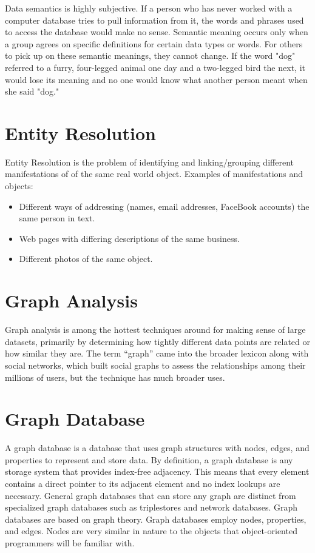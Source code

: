 \documentclass[11pt]{article} %
\begin{document}
Data semantics is highly subjective. If a person who has never worked with a computer database tries to pull information from it, the words and phrases used to access the database would make no sense. Semantic meaning occurs only when a group agrees on specific definitions for certain data types or words. For others to pick up on these semantic meanings, they cannot change. If the word "dog" referred to a furry, four-legged animal one day and a two-legged bird the next, it would lose its meaning and no one would know what another person meant when she said "dog."

\newpage


\section{Entity Resolution}

Entity Resolution is the problem of identifying and linking/grouping different manifestations of of the same real world object. Examples of manifestations and objects:
\begin{itemize}
\item Different ways of addressing (names, email addresses, FaceBook
accounts) the same person in text.
\item Web pages with differing descriptions of the same business.
\item Different photos of the same object.
\end{itemize}

\newpage
\section{Graph Analysis}
Graph analysis is among the hottest techniques around for making sense of large datasets, primarily by determining how tightly different data points are related or how similar they are. The term “graph” came into the broader lexicon along with social networks, which built social graphs to assess the relationships among their millions of users, but the technique has much broader uses.
\section{Graph Database}

A graph database is a database that uses graph structures with nodes, edges, and properties to represent and store data. By definition, a graph database is any storage system that provides index-free adjacency. This means that every element contains a direct pointer to its adjacent element and no index lookups are necessary. General graph databases that can store any graph are distinct from specialized graph databases such as triplestores and network databases.
Graph databases are based on graph theory. Graph databases employ nodes, properties, and edges. Nodes are very similar in nature to the objects that object-oriented programmers will be familiar with.
\end{document}
